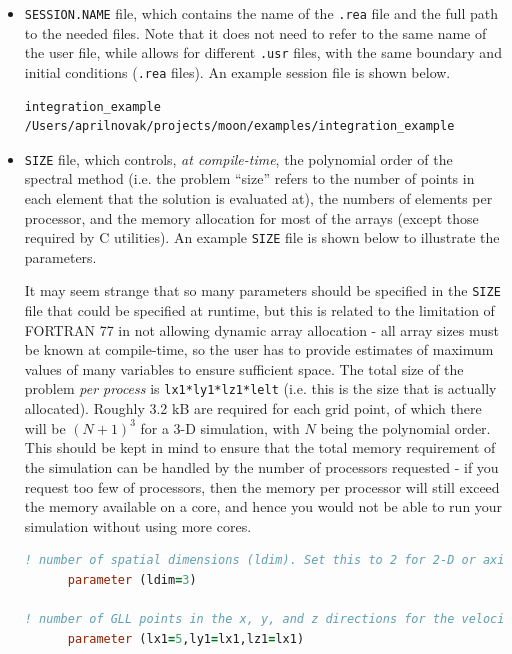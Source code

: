 \documentclass[10pt]{article}
\numberwithin{equation}{section} %
\begin{document}
\begin{itemize}
\item {\tt SESSION.NAME} file, which contains the name of the {\tt .rea} file and the full path to the needed files. Note that it does not need to refer to the same name of the user file, while allows for different {\tt .usr} files, with the same boundary and initial conditions ({\tt .rea} files). An example session file is shown below. 

\begin{lstlisting}
integration_example
/Users/aprilnovak/projects/moon/examples/integration_example
\end{lstlisting}

\item {\tt SIZE} file, which controls, {\it at compile-time}, the polynomial order of the spectral method (i.e. the problem ``size'' refers to the number of points in each element that the solution is evaluated at), the numbers of elements per processor, and the memory allocation for most of the arrays (except those required by C utilities). An example {\tt SIZE} file is shown below to illustrate the parameters. 

It may seem strange that so many parameters should be specified in the {\tt SIZE} file that could be specified at runtime, but this is related to the limitation of FORTRAN 77 in not allowing dynamic array allocation - all array sizes must be known at compile-time, so the user has to provide estimates of maximum values of many variables to ensure sufficient space. The total size of the problem {\it per process} is {\tt lx1*ly1*lz1*lelt} (i.e. this is the size that is actually allocated). Roughly 3.2 kB are required for each grid point, of which there will be \((N+1)^3\) for a 3-D simulation, with \(N\) being the polynomial order. This should be kept in mind to ensure that the total memory requirement of the simulation can be handled by the number of processors requested - if you request too few of processors, then the memory per processor will still exceed the memory available on a core, and hence you would not be able to run your simulation without using more cores. 

\begin{lstlisting}[language=Fortran]
! number of spatial dimensions (ldim). Set this to 2 for 2-D or axisymmetric calculations.
      parameter (ldim=3)

! number of GLL points in the x, y, and z directions for the velocity mesh (mesh1). For 2-D meshes, simply set lz1=1. lx2, ly2, and lz2 can also be set to specify the number of GLL points for the pressure mesh (mesh2) and for mesh 3. It is common to use a relatively low-order approximation such as lx1=5 and then to run this for several flow times and use it as an initial condition for a higher-order run that is used to obtain actual results. You should design the mesh to use a polynomial order of 7 or 9.
      parameter (lx1=5,ly1=lx1,lz1=lx1)


\end{lstlisting}
\end{itemize}
\end{document}
